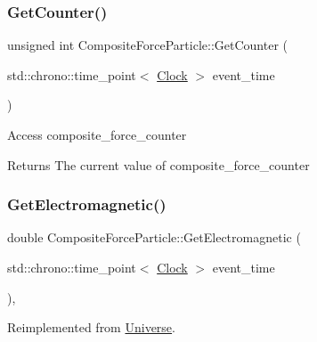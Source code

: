 \mbox{\label{classCompositeForceParticle_ae0bc57309f04b784b2c23b82db869b25}} 
\subsubsection{\texorpdfstring{Get\+Counter()}{GetCounter()}}
{\footnotesize\ttfamily unsigned int Composite\+Force\+Particle\+::\+Get\+Counter (\begin{DoxyParamCaption}\item[{std\+::chrono\+::time\+\_\+point$<$ \mbox{\hyperlink{universe_8h_a0ef8d951d1ca5ab3cfaf7ab4c7a6fd80}{Clock}} $>$}]{event\+\_\+time }\end{DoxyParamCaption})\hspace{0.3cm}{\ttfamily [inline]}}

Access composite\+\_\+force\+\_\+counter \begin{DoxyReturn}{Returns}
The current value of composite\+\_\+force\+\_\+counter 
\end{DoxyReturn}
\mbox{\label{classCompositeForceParticle_a8ef336fed7e33d52a3baae4bd4dd32fd}} 
\subsubsection{\texorpdfstring{Get\+Electromagnetic()}{GetElectromagnetic()}}
{\footnotesize\ttfamily double Composite\+Force\+Particle\+::\+Get\+Electromagnetic (\begin{DoxyParamCaption}\item[{std\+::chrono\+::time\+\_\+point$<$ \mbox{\hyperlink{universe_8h_a0ef8d951d1ca5ab3cfaf7ab4c7a6fd80}{Clock}} $>$}]{event\+\_\+time }\end{DoxyParamCaption})\hspace{0.3cm}{\ttfamily [inline]}, {\ttfamily [virtual]}}



Reimplemented from \mbox{\hyperlink{classUniverse_a63b850ef3f3394313353109d222bf5d1}{Universe}}.

